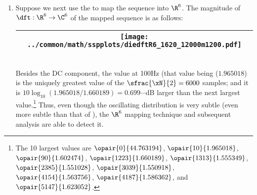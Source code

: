 \begin{example}
\begin{enumerate}
  \item \label{item:nonstat34_12000m1200_R6}
    Suppose we next use the   to map
    the sequence into $\R^6$.
    The magnitude of $\dft:\R^6\to\C^6$ of the mapped sequence is as follows:
    \\\begin{tabular}{|>{\scs}c|}
         \hline
         \texttt{[image: ../common/math/sspplots/diedftR6\_1620\_12000m1200.pdf]}%
       \\\hline
    \end{tabular}\\
    Besides the DC component, the value at 100Hz (that value being ($1.965018$) 
    is the uniquely greatest value of the $\sfrac{\xN}{2}=6000$ samples;
    and it is $10\log_{10}(1.965018/1.660189)=0.699\cdots$dB larger than the next largest value.\footnote{
    The 10 largest values are
    $\opair{    0}{44.763194}$, $\opair{   10}{ 1.965018}$, $\opair{   90}{ 1.602474}$, $\opair{ 1223}{ 1.660189}$,
    $\opair{ 1313}{ 1.555349}$, $\opair{ 2385}{ 1.551028}$, $\opair{ 3039}{ 1.550918}$, $\opair{ 4154}{ 1.563756}$,
    $\opair{ 4187}{ 1.586362}$, and $\opair{ 5147}{ 1.623052}$.}
    Thus, even though the oscillating distribution is very subtle
    (even more subtle than that of ), the $\R^6$ mapping technique and subsequent analysis
    are able to detect it.
\end{enumerate}
\end{example}

